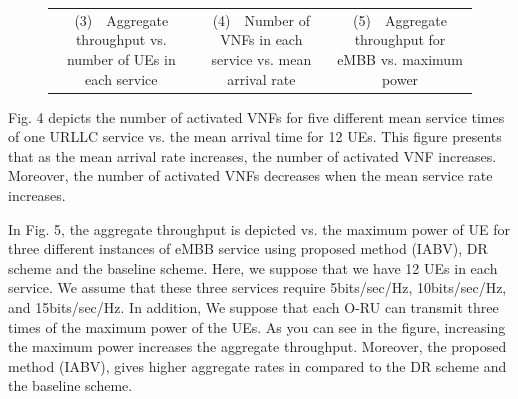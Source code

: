 \documentclass[lettersize,journal]{IEEEtran}
\begin{document}
\begin{figure}[!htb]
{\begin{tabular}{c@{}c@{}c}
			\scriptsize(3)~~Aggregate throughput vs. number of UEs in each service & \scriptsize(4)~~Number of  VNFs in each service vs. mean arrival rate & \scriptsize(5)~~Aggregate throughput for eMBB vs. maximum  power 
	\end{tabular}}
	\label{label}
\end{figure}

Fig. 4 depicts the number of activated VNFs for five different mean service times of one URLLC service vs. the mean arrival time for 12 UEs. This figure presents that as the mean arrival rate increases, the number of activated VNF increases. Moreover, the number of activated VNFs decreases when the mean service rate increases.


In Fig. 5, the aggregate throughput is depicted vs. the maximum power of UE for three different instances of eMBB service using proposed method (IABV), DR scheme and the baseline scheme. Here, we suppose that we have 12 UEs in each service.  We assume that these three services require 5bits/sec/Hz, 10bits/sec/Hz, and 15bits/sec/Hz.
In addition, We suppose that each O-RU can transmit three times of the maximum power of the UEs. As you can see in the figure, increasing the maximum power increases the aggregate throughput. Moreover, the proposed method (IABV), gives higher aggregate rates in compared to the DR scheme and the baseline scheme.
\end{document}
